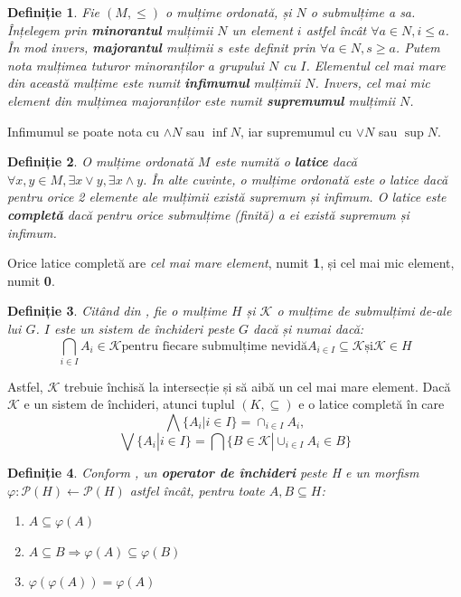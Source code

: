 \documentclass[12pt, a4paper, twoside, romanian]{teza-upb}
\newtheorem{defn}{Definiție}
\begin{document}
    \begin{defn}
      Fie $(M, \le)$ o mulțime ordonată, și $N$ o submulțime a sa. Înțelegem prin \textbf{minorantul} mulțimii $N$ un element $i$ astfel încât $\forall a \in N, i \le a$. În mod invers, \textbf{majorantul} mulțimii $s$ este definit prin $\forall a \in N, s \ge a$.
      Putem nota mulțimea tuturor minoranților a grupului $N$ cu $I$. Elementul cel mai mare din această mulțime este numit \textbf{infimumul} mulțimii $N$. Invers, cel mai mic element din mulțimea majoranților este numit \textbf{supremumul} mulțimii $N$.
    \end{defn}

    Infimumul se poate nota cu $\wedge N$ sau $\inf N$, iar supremumul cu $\vee N$ sau $\sup N$.

    \begin{defn}
      O mulțime ordonată $M$ este numită o \textbf{latice} dacă $\forall x,y \in M, \exists x \vee y, \exists x \wedge y$. În alte cuvinte, o mulțime ordonată este o latice dacă pentru orice 2 elemente ale mulțimii există supremum și infimum. O latice este \textbf{completă} dacă pentru orice submulțime (finită) a ei există supremum și infimum.
    \end{defn}

    Orice latice completă are \textit{cel mai mare element}, numit \textbf{1}, și cel mai mic element, numit \textbf{0}.


    \begin{defn}
      Citând din \cite{Carpineto:2004:CDA:975252}, fie o mulțime $H$ și $\mathcal{K}$ o mulțime de submulțimi de-ale lui $G$. $I$ este un sistem de închideri peste $G$ dacă și numai dacă:
      $$
        \bigcap_{i \in I} A_i \in \mathcal{K} \text{pentru fiecare submulțime nevidă} A_{i \in I} \subseteq \mathcal{K} \text{și} \mathcal{K} \in H
      $$
    \end{defn}

    Astfel, $\mathcal{K}$ trebuie închisă la intersecție și să aibă un cel mai mare element. Dacă $\mathcal{K}$ e un sistem de închideri, atunci tuplul $(K, \subseteq)$ e o latice completă în care
      $$
      \bigwedge \{ A_i | i \in I \} = \cap_{i \in I} A_i, 
      $$
      $$
      \bigvee \{ A_i | i \in I \} = \bigcap \{ B \in \mathcal{K} | \cup _{i \in I} A_i \in B \}
    $$

    \begin{defn}
      Conform \cite{Carpineto:2004:CDA:975252}, un \textbf{operator de închideri} peste H e un morfism $\varphi : \mathcal{P}(H) \leftarrow \mathcal{P}(H)$ astfel încât, pentru toate $A, B \subseteq H$:
      \begin{enumerate}
        \item $A \subseteq \varphi(A)$
        \item $A \subseteq B \Rightarrow \varphi(A) \subseteq \varphi(B)$
        \item $\varphi(\varphi(A)) = \varphi(A)$
      \end{enumerate}
    \end{defn}
\end{document}
